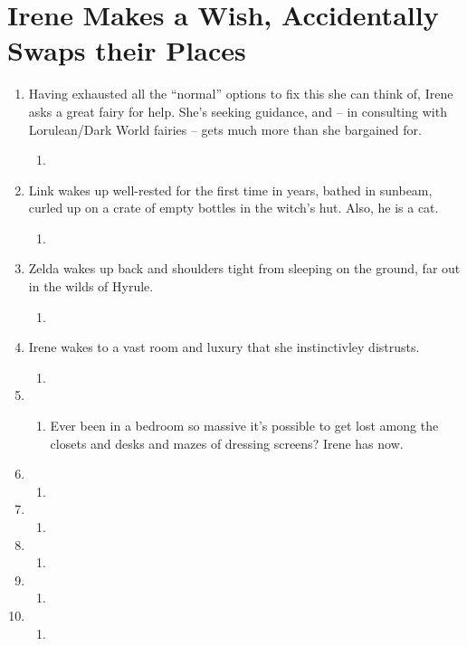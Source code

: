 \documentclass[../FGP.tex]{subfiles}
\begin{document}
\section{Irene Makes a Wish, Accidentally Swaps their Places}
\begin{enumerate}
\item Having exhausted all the ``normal'' options to fix this she can think of, Irene asks a great fairy for help. She's seeking guidance, and -- in consulting with Lorulean/Dark World fairies -- gets much more than she bargained for.\begin{enumerate} \item \end{enumerate}
\item Link wakes up well-rested for the first time in years, bathed in sunbeam, curled up on a crate of empty bottles in the witch's hut. Also, he is a cat.\begin{enumerate} \item \end{enumerate}
\item Zelda wakes up back and shoulders tight from sleeping on the ground, far out in the wilds of Hyrule.\begin{enumerate} \item \end{enumerate}
\item Irene wakes to a vast room and luxury that she instinctivley distrusts. \begin{enumerate} \item \end{enumerate}  
   \item \begin{enumerate} \item Ever been in a bedroom so massive it's possible to get lost among the closets and desks and mazes of dressing screens? Irene has now. \end{enumerate}
   \item \begin{enumerate} \item \end{enumerate}
   \item \begin{enumerate} \item \end{enumerate}
   \item \begin{enumerate} \item \end{enumerate} 
   \item \begin{enumerate} \item \end{enumerate} 
   \item \begin{enumerate} \item \end{enumerate}
\end{enumerate}
\end{document}
